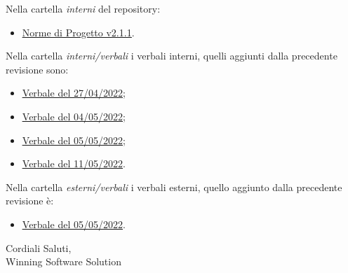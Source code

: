 \documentclass[a4paper, 12pt]{letter}
\begin{document}
Nella cartella \textit{interni} del repository:
\begin{itemize}
    \item \href{https://github.com/iota97/WinningSoftwareSolution/tree/main/public/interni/norme_di_progetto_v2.1.1.pdf}{\underline{Norme di Progetto v2.1.1}}.
\end{itemize}

Nella cartella \textit{interni/verbali} i verbali interni, quelli aggiunti dalla precedente revisione sono:
\begin{itemize}
    \item \href{https://github.com/iota97/WinningSoftwareSolution/tree/main/public/interni/verbali/2022_04_27_I.pdf}{\underline{Verbale del 27/04/2022}};
    \item \href{https://github.com/iota97/WinningSoftwareSolution/tree/main/public/interni/verbali/2022_05_04_I.pdf}{\underline{Verbale del 04/05/2022}};
    \item \href{https://github.com/iota97/WinningSoftwareSolution/tree/main/public/interni/verbali/2022_05_05_I.pdf}{\underline{Verbale del 05/05/2022}};
    \item \href{https://github.com/iota97/WinningSoftwareSolution/tree/main/public/interni/verbali/2022_05_11_I.pdf}{\underline{Verbale del 11/05/2022}}.
\end{itemize}

Nella cartella \textit{esterni/verbali} i verbali esterni, quello aggiunto dalla precedente revisione è:
\begin{itemize}
    \item \href{https://github.com/iota97/WinningSoftwareSolution/tree/main/public/esterni/verbali/2022_05_05_E.pdf}{\underline{Verbale del 05/05/2022}}.
\end{itemize}

\begin{flushright}
Cordiali Saluti,\\
Winning Software Solution\\
\end{flushright}
\end{document}
